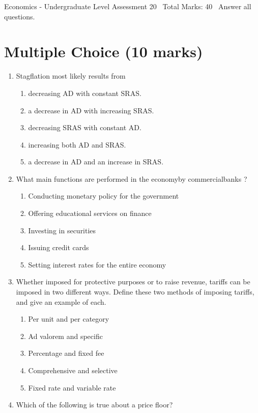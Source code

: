 \documentclass[12pt]{article}
\begin{document}
\begin{center}
Economics - Undergraduate Level Assessment 20 \
Total Marks: 40 \
Answer all questions.
\end{center}

\section*{Multiple Choice (10 marks)}
\begin{enumerate}[label=\arabic*.]
\item Stagflation most likely results from
\begin{enumerate}[label=(\alph*)]
    \item decreasing AD with constant SRAS.
    \item a decrease in AD with increasing SRAS.
    \item decreasing SRAS with constant AD.
    \item increasing both AD and SRAS.
    \item a decrease in AD and an increase in SRAS.
\end{enumerate}
\item What main functions are performed in the economyby commercialbanks ?
\begin{enumerate}[label=(\alph*)]
    \item Conducting monetary policy for the government
    \item Offering educational services on finance
    \item Investing in securities
    \item Issuing credit cards
    \item Setting interest rates for the entire economy
\end{enumerate}
\item Whether imposed for protective purposes or to raise revenue, tariffs can be imposed in two different ways. Define these two methods of imposing tariffs, and give an example of each.
\begin{enumerate}[label=(\alph*)]
    \item Per unit and per category
    \item Ad valorem and specific
    \item Percentage and fixed fee
    \item Comprehensive and selective
    \item Fixed rate and variable rate
\end{enumerate}
\item Which of the following is true about a price floor?

\end{enumerate}
\end{document}

